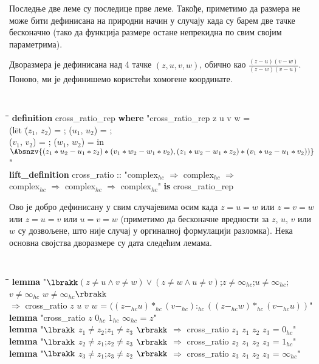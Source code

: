 \noindent Последње две леме су последице прве леме. Такође, приметимо
да размера не може бити дефинисана на природни начин у случају када су
барем две тачке бесконачно (тако да функција размере остане непрекидна
по свим својим параметрима).

Дворазмера је дефинисана над 4 тачке $(z, u, v, w)$, обично као
$\frac{(z-u)(v-w)}{(z-w)(v-u)}$. Поново, ми је дефинишемо користећи
хомогене координате.

{\tt
\begin{tabbing}
\hspace{3mm}\=\hspace{3mm}\=\hspace{3mm}\=\hspace{3mm}\=\hspace{3mm}\=\kill
{\bf definition} cross\_ratio\_rep {\bf where} "cross\_ratio\_rep z u v w = \\
\>(l\=et \=($z_1$, $z_2$) = ; ($u_1$, $u_2$) = ;\\
\>\>\> ($v_1$, $v_2$) = ; ($w_1$, $w_2$) =  in\\
\>$\Absnzv{(z_1*u_2 - u_1*z_2)*(v_1*w_2 - w_1*v_2), (z_1*w_2 - w_1*z_2)*(v_1*u_2 - u_1*v_2))}$"\\
{\bf lift\_definition} cross\_ratio :: "complex$_{hc}$ $\Rightarrow$ complex$_{hc}$ $\Rightarrow$ \\
\>complex$_{hc}$ $\Rightarrow$ complex$_{hc}$ $\Rightarrow$ complex$_{hc}$" {\bf is} cross\_ratio\_rep
\end{tabbing}
}

Ово је добро дефинисану у свим случајевима осим када $z=u=w$ или
$z=v=w$ или $z=u=v$ или $u=v=w$ (приметимо да бесконачне вредности за
$z$, $u$, $v$ или $w$ су дозвољене, што није случај у оргиналној
формулацији разломка). Нека основна својства дворазмере су дата
следећим лемама.

{\tt
\begin{tabbing}
\hspace{5mm}\=\hspace{5mm}\=\hspace{5mm}\=\hspace{5mm}\=\hspace{5mm}\=\kill
{\bf lemma} "$\lbrakk$$(z \neq u \wedge v \neq w) \vee (z \neq w \wedge u \neq v)$;$z \neq \infty_{hc}$;$u \neq \infty_{hc}$;$v \neq \infty_{hc}$ $w \neq \infty_{hc}$$\rbrakk$\\ 
\> $\Longrightarrow$ cross\_ratio $z$ $u$ $v$ $w$ = $((z-_{hc}u) *_{hc} (v-_{hc}) :_{hc} ((z-_{hc}w) *_{hc} (v-_{hc}u))$"\\
{\bf lemma} "cross\_ratio $z$ $0_{hc}$ $1_{hc}$ $\infty_{hc}$ = $z$"\\
{\bf lemma} "$\lbrakk$ $z_1 \neq z_2$;$z_1 \neq z_3$ $\rbrakk$ $\Longrightarrow$ cross\_ratio $z_1$ $z_1$ $z_2$ $z_3$ = $0_{hc}$"\\
{\bf lemma} "$\lbrakk$ $z_2 \neq z_1$;$z_2 \neq z_3$ $\rbrakk$ $\Longrightarrow$ cross\_ratio $z_2$ $z_1$ $z_2$ $z_3$ = $1_{hc}$"\\
{\bf lemma} "$\lbrakk$ $z_3 \neq z_1$;$z_3 \neq z_2$ $\rbrakk$ $\Longrightarrow$ cross\_ratio $z_3$ $z_1$ $z_2$ $z_3$ = $\infty_{hc}$"
\end{tabbing}
}

